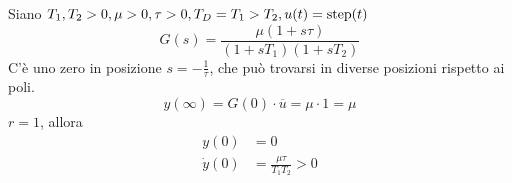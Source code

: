 Siano $T_1 ,T_2  >0,\mu  >0,\tau  >0,T_D =T_1  >T_2 ,u(t) =\operatorname{step}(t)$
\begin{equation*}
	G(s)=\frac{\mu (1+s\tau)}{(1+sT_1)(1+sT_2)}
\end{equation*}
C'è uno zero in posizione $s=-\frac{1}{\tau }$, che può trovarsi in diverse posizioni rispetto ai poli.
\begin{equation*}
	y(\infty) =G(0) \cdotp \overline{u} =\mu \cdotp 1=\mu 
\end{equation*}
$r=1$, allora
\begin{equation*}
	\begin{aligned}
		y(0)        & =0                             \\
		\dot{y} (0) & =\frac{\mu \tau }{T_1 T_2}  >0 
	\end{aligned}
\end{equation*}
